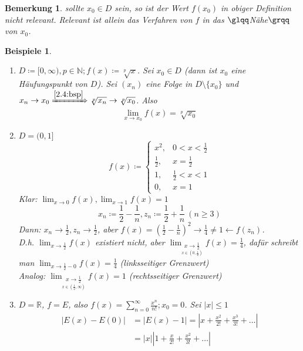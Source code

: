 \documentclass[14pt,titlepage,ngerman,a4paper,headsepline,DIV15,halfparskip*]{scrartcl}
\newcommand{\N}{\mathbb{N}}
\newcommand{\R}{\mathbb{R}}
\theoremstyle{named}
\theoremstyle{dotless}
\newtheorem*{beispiele}{Beispiele}
\newtheorem*{bemerkung}{Bemerkung}
\begin{document}
\begin{bemerkung}
	sollte $x_{0} \in D$ sein, so ist der Wert $f(x_{0})$ in obiger Definition nicht relevant. Relevant ist allein das Verfahren von $f$ in das $\glqq$Nähe$\grqq$ von $x_{0}$.	
\end{bemerkung}

 
\begin{beispiele} ~\
	\begin{enumerate}
		\item $D \coloneqq [0, \infty), p \in \N; f(x) \coloneqq \sqrt[p]{x}$. Sei $x_{0} \in D$ (dann ist $x_{0}$ eine Häufungspunkt von $D$). Sei $(x_{n})$ eine Folge in $D \setminus \{ x_{0} \}$ und $x_{n} \rightarrow x_{0} \xRightarrow[]{\ref{2.4:bsp}} \sqrt[p]{x_{n}} \rightarrow \sqrt[p]{x_{0}}$. Also
			$$ \lim_{x \rightarrow x_{0}} f(x) = \sqrt[p]{x_{0}} $$
		\item $D = (0, 1]$
			$$ f(x) \coloneqq \begin{cases} x^{2}, & 0 < x < \frac{1}{2} \\ \frac{1}{2}, & x = \frac{1}{2} \\ 1, & \frac{1}{2} < x < 1 \\ 0, & x = 1 \end{cases} $$
			Klar: $\lim_{x \rightarrow 0} f(x), \lim_{x \rightarrow 1} f(x) = 1$
			$$ x_{n} \coloneqq \frac{1}{2} - \frac{1}{n}, z_{n} \coloneqq \frac{1}{2} + \frac{1}{n} ~(n \geq 3) $$
			Dann: $x_{n} \rightarrow \frac{1}{2}, z_{n} \rightarrow \frac{1}{2}$, aber $f(x) = \left( \frac{1}{2} - \frac{1}{n} \right)^{2} \rightarrow \frac{1}{4} \neq 1 \leftarrow f(z_{n})$. \\
			D.h. $\lim_{x \rightarrow \frac{1}{2}} f(x)$ existiert nicht, aber $\lim_{\underset{x \in (0, \frac{1}{2})}{x \rightarrow \frac{1}{2}}} f(x) = \frac{1}{4}$, dafür schreibt man $\lim_{x \rightarrow \frac{1}{2}-0} f(x) = \frac{1}{4}$ (linksseitiger Grenzwert) \\
			Analog: $\lim_{\underset{x \in (\frac{1}{2}, \infty)}{x \rightarrow \frac{1}{2}}} f(x) = 1$ (rechtsseitiger Grenzwert)
		\item $D = \R$, $f = E$, also $f(x) = \sum_{n=0}^{\infty} \frac{x^{n}}{n!}; x_{0} = 0$. Sei $|x| \leq 1$
			\begin{align*}
				|E(x) - E(0)| & = |E(x) - 1| = |x + \frac{x^{2}}{2!} + \frac{x^{3}}{3!} + \dotsc | \\
				& = |x| \left| 1 + \frac{x}{2!} + \frac{x^{2}}{3!} + \dotsc \right| \\

\end{align*}
\end{enumerate}
\end{beispiele}
\end{document}
